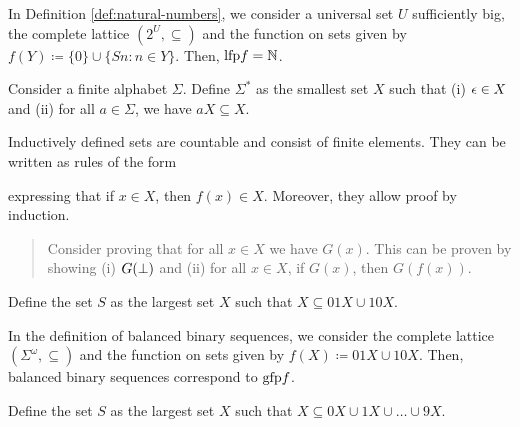 \begin{remark}
    In Definition \ref{def:natural-numbers}, we consider a universal set $U$ sufficiently big, the complete lattice $(2^U, \subseteq)$ and the function on sets given by $f(Y) \coloneqq \{0\} \cup \{ S n : n \in Y \}$. 
Then, $\lfp f = \NN$.	
\end{remark}



\begin{definition}
    Consider a finite alphabet $\Sigma$.
	Define $\Sigma^*$ as the smallest set $X$ such that (i) $\emptystring \in X$ and (ii) for all $a \in \Sigma$, we have $aX \subseteq X$.
\end{definition}

\begin{remark}
    Inductively defined sets are countable and consist of finite elements.
    They can be written as rules of the form
\begin{prooftree}
\end{prooftree}
    expressing that if $x \in X$, then $f(x) \in X$. Moreover, they allow proof by induction. 
    \begin{quote}
         Consider proving that for all $x \in X$ we have $G(x)$. This can be proven by showing (i) $G(\bottom)$ and (ii) for all $x \in X$, if $G(x)$, then $G(f(x))$.
    \end{quote}
\end{remark}

\begin{definition}
    Define the set $S$ as the largest set $X$ such that $X \subseteq 01X \cup 10X$.
\end{definition}

\begin{remark}
    In the definition of balanced binary sequences, we consider the complete lattice $(\Sigma^\omega, \subseteq)$ and the function on sets given by $f(X) \coloneqq 01X \cup 10X$. Then, balanced binary sequences correspond to $\gfp f$.	
\end{remark}


\begin{definition}[Interval {$[0, 1]$}]
    Define the set $S$ as the largest set $X$ such that $X \subseteq 0X \cup 1X \cup \ldots \cup 9X$.
\end{definition}


